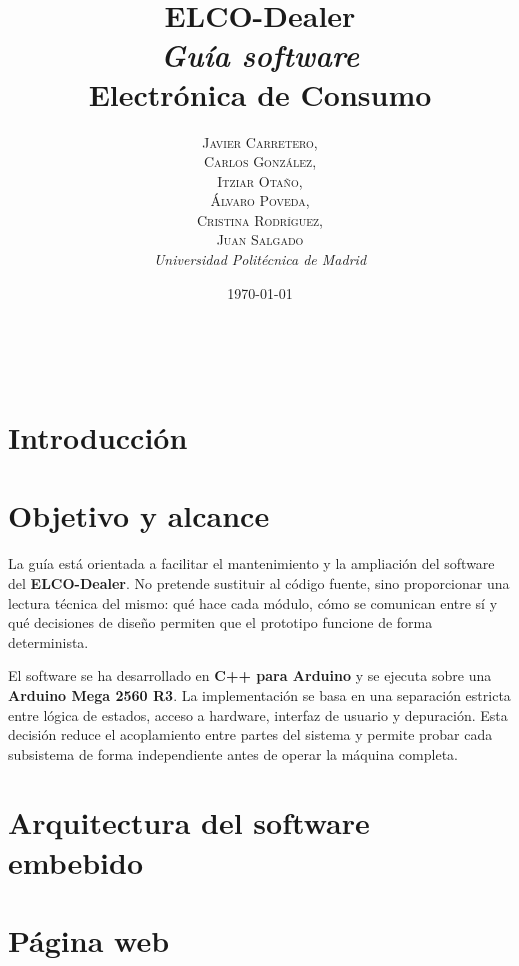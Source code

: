\documentclass[a4paper, 11pt]{article}
\title{\textbf{ELCO-Dealer}
\\
\textit{Guía software} \\ 
\vspace{0.35cm}
Electrónica de Consumo}
\author{
\textsc{
Javier Carretero,\\
Carlos González,\\
Itziar Otaño,\\
Álvaro Poveda,\\
Cristina Rodríguez,\\
Juan Salgado
}\\[4pt]
\textit{Universidad Politécnica de Madrid}
}
\date{\today}
\makeatletter
\renewcommand{\maketitle}{
  \begin{flushright}
    {\LARGE\@title}

    \vspace{50pt}

    {\large\@author}\\
    \@date

    \vspace{40pt}
  \end{flushright}
}
\makeatother
\begin{document}
\hypersetup{pageanchor=false}


\begin{titlepage}
\thispagestyle{portada}

\maketitle

\end{titlepage}

\clearpage
\hypersetup{pageanchor=true}
\setcounter{page}{1}


\tableofcontents
\newpage

\section{Introducción}


\section{Objetivo y alcance}
La guía está orientada a facilitar el mantenimiento y la ampliación del software del \textbf{ELCO-Dealer}. No pretende sustituir al código fuente, sino proporcionar una lectura técnica del mismo: qué hace cada módulo, cómo se comunican entre sí y qué decisiones de diseño permiten que el prototipo funcione de forma determinista.

El software se ha desarrollado en \textbf{C++ para Arduino} y se ejecuta sobre una \textbf{Arduino Mega 2560 R3}. La implementación se basa en una separación estricta entre lógica de estados, acceso a hardware, interfaz de usuario y depuración. Esta decisión reduce el acoplamiento entre partes del sistema y permite probar cada subsistema de forma independiente antes de operar la máquina completa.

\section{Arquitectura del software embebido}


\newpage
\section{Página web}

\end{document}
